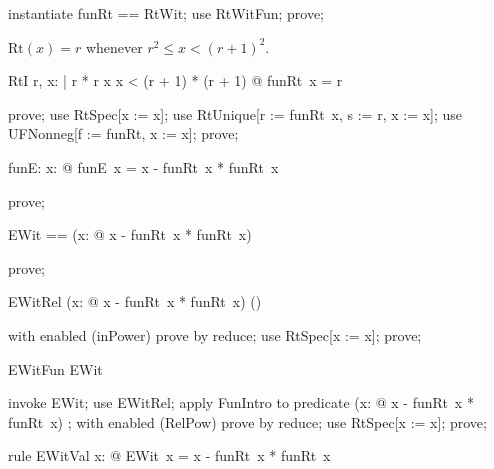 \documentclass{article}
\begin{document}
\begin{zproof}
instantiate funRt == RtWit;
use RtWitFun;
prove;
\end{zproof}

$\mathrm{Rt}(x) = r$ whenever $r^2 \le x < (r+1)^2$.

\begin{theorem}{RtI}
  \forall r, x: \nat | r * r \leq x \land x < (r + 1) * (r + 1) @ funRt~x = r
\end{theorem}

\begin{zproof}
prove;
use RtSpec[x := x];
use RtUnique[r := funRt~x, s := r, x := x];
use UFNonneg[f := funRt, x := x];
prove;
\end{zproof}

\begin{axdef}
  funE: \nat \fun \nat
\where
   \forall x: \nat @ funE~x = x - funRt~x * funRt~x
\end{axdef}

\begin{zproof}
prove;
\end{zproof}

\begin{zed}
  EWit == (\lambda x: \nat @ x - funRt~x * funRt~x)
\end{zed}

\begin{zproof}
prove;
\end{zproof}

\begin{theorem}{EWitRel}
  (\lambda x: \nat @ x - funRt~x * funRt~x) \in \power (\nat \cross \nat)
\end{theorem}

\begin{zproof}
with enabled (inPower) prove by reduce;
use RtSpec[x := x];
prove;
\end{zproof}

\begin{theorem}{EWitFun}
  EWit \in \nat \fun \nat
\end{theorem}

\begin{zproof}
invoke EWit;
use EWitRel;
apply FunIntro to predicate (\lambda x: \nat @ x - funRt~x * funRt~x) \in \nat \fun \nat;
with enabled (RelPow) prove by reduce;
use RtSpec[x := x];
prove;
\end{zproof}

\begin{theorem}{rule EWitVal}
  \forall x: \nat @ EWit~x = x - funRt~x * funRt~x
\end{theorem}
\end{document}
